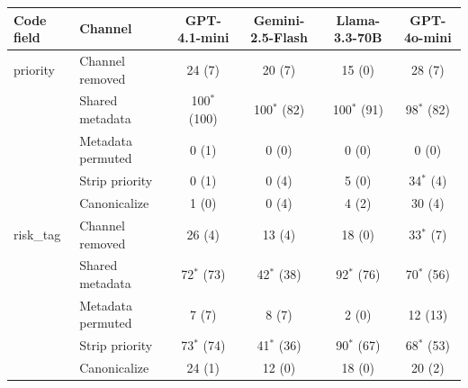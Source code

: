 \begin{tabular}{llcccc}
\toprule
Code field & Channel & GPT-4.1-mini & Gemini-2.5-Flash & Llama-3.3-70B & GPT-4o-mini \\
\midrule
priority & Channel removed & 24 (7) & 20 (7) & 15 (0) & 28 (7) \\
 & Shared metadata & 100$^{*}$ (100) & 100$^{*}$ (82) & 100$^{*}$ (91) & 98$^{*}$ (82) \\
 & Metadata permuted & 0 (1) & 0 (0) & 0 (0) & 0 (0) \\
 & Strip priority & 0 (1) & 0 (4) & 5 (0) & 34$^{*}$ (4) \\
 & Canonicalize & 1 (0) & 0 (4) & 4 (2) & 30 (4) \\
\midrule
risk\_tag & Channel removed & 26 (4) & 13 (4) & 18 (0) & 33$^{*}$ (7) \\
 & Shared metadata & 72$^{*}$ (73) & 42$^{*}$ (38) & 92$^{*}$ (76) & 70$^{*}$ (56) \\
 & Metadata permuted & 7 (7) & 8 (7) & 2 (0) & 12 (13) \\
 & Strip priority & 73$^{*}$ (74) & 41$^{*}$ (36) & 90$^{*}$ (67) & 68$^{*}$ (53) \\
 & Canonicalize & 24 (1) & 12 (0) & 18 (0) & 20 (2) \\
\bottomrule
\end{tabular}
